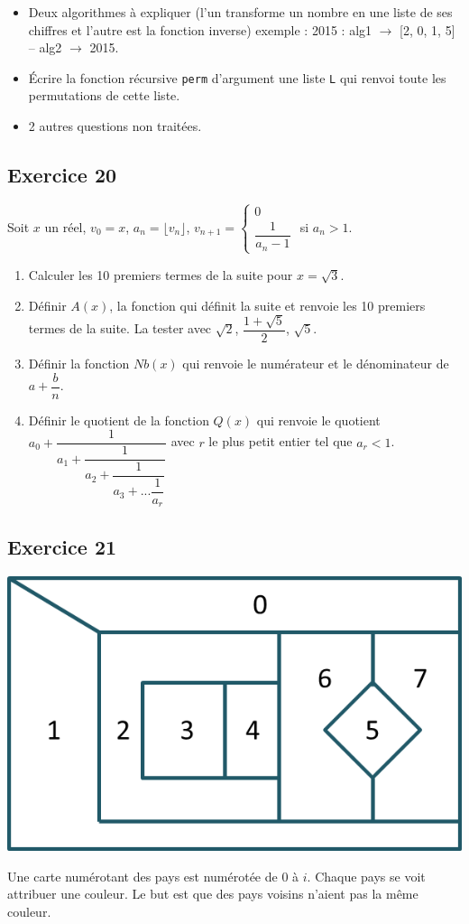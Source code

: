 \documentclass[10pt,fleqn]{article} %
\begin{document}
\begin{multicols}{2}
\begin{itemize}
\item Deux algorithmes à expliquer (l'un transforme un nombre en une liste de ses chiffres et l’autre est la fonction inverse) exemple : 2015 : alg1 $\rightarrow$  [2, 0, 1, 5] --  alg2  $\rightarrow$ 2015.
\item Écrire la fonction récursive \texttt{perm} d’argument une liste \texttt{L} qui renvoi toute les permutations
de cette liste.
\item 2 autres questions non traitées.
\end{itemize}

\subsection*{Exercice 20}
Soit $x$ un réel, $v_0=x$, $a_n = \lfloor v_n \rfloor$, $v_{n+1} = \left\{ \begin{array}{l} 0 \\ \dfrac{1}{a_n -1} \end{array} \right.$ si $a_n>1$.
\begin{enumerate}
\item Calculer les 10 premiers termes de la suite pour $x=\sqrt{3}$. 
\item Définir $A(x)$, la fonction qui définit la suite et renvoie les 10 premiers termes de la suite. La tester avec $\sqrt{2}$, $\dfrac{1+\sqrt{5}}{2}$, $\sqrt{5}$. 
\item Définir la fonction $Nb(x)$ qui renvoie le numérateur et le dénominateur de $a+\dfrac{b}{n}$. 
\item Définir le quotient de la fonction $Q(x)$ qui renvoie le quotient $a_0+\dfrac{1}{a_1+\dfrac{1}{a_2+\dfrac{1}{a_3+...\dfrac{1}{a_r}}}}$ avec $r$ le plus petit entier tel que $a_r<1$.
\end{enumerate}


\subsection*{Exercice 21}
\begin{center}
\includegraphics[width=.8\linewidth]{images/exo_21_pt_el.png}
\end{center}
Une carte numérotant des pays est numérotée de 0 à $i$.  Chaque pays se voit attribuer une couleur. Le but est que des pays voisins n'aient pas la même couleur. 


\end{multicols}
\end{document}
